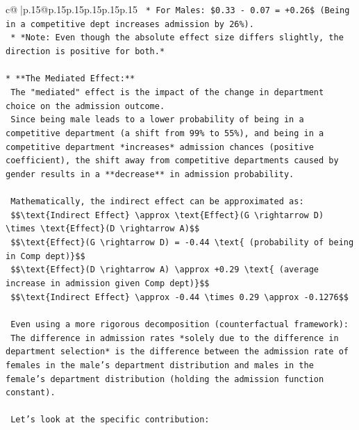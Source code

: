 \documentclass{article}
\begin{document}
{\begin{supertabular}{c@{$\;$}|p{.15\linewidth}@{}p{.15\linewidth}p{.15\linewidth}p{.15\linewidth}p{.15\linewidth}p{.15\linewidth}}
{{{\texttt{    *   For Males: \$0.33 {-} 0.07 = +0.26\$ (Being in a competitive dept increases admission by 26\%).} \\
\texttt{    *   *Note: Even though the absolute effect size differs slightly, the direction is positive for both.*} \\
\\ 
\texttt{*   **The Mediated Effect:**} \\
\texttt{    The "mediated" effect is the impact of the change in department choice on the admission outcome.} \\
\texttt{    Since being male leads to a lower probability of being in a competitive department (a shift from 99\% to 55\%), and being in a competitive department *increases* admission chances (positive coefficient), the shift away from competitive departments caused by gender results in a **decrease** in admission probability.} \\
\\ 
\texttt{    Mathematically, the indirect effect can be approximated as:} \\
\texttt{    \$\$\textbackslash{}text\{Indirect Effect\} \textbackslash{}approx \textbackslash{}text\{Effect\}(G \textbackslash{}rightarrow D) \textbackslash{}times \textbackslash{}text\{Effect\}(D \textbackslash{}rightarrow A)\$\$} \\
\texttt{    \$\$\textbackslash{}text\{Effect\}(G \textbackslash{}rightarrow D) = {-}0.44 \textbackslash{}text\{ (probability of being in Comp dept)\}\$\$} \\
\texttt{    \$\$\textbackslash{}text\{Effect\}(D \textbackslash{}rightarrow A) \textbackslash{}approx +0.29 \textbackslash{}text\{ (average increase in admission given Comp dept)\}\$\$} \\
\texttt{    \$\$\textbackslash{}text\{Indirect Effect\} \textbackslash{}approx {-}0.44 \textbackslash{}times 0.29 \textbackslash{}approx {-}0.1276\$\$} \\
\\ 
\texttt{    Even using a more rigorous decomposition (counterfactual framework):} \\
\texttt{    The difference in admission rates *solely due to the difference in department selection* is the difference between the admission rate of females in the male's department distribution and males in the female's department distribution (holding the admission function constant).} \\
\\ 
\texttt{    Let's look at the specific contribution:} \\
}}}
\end{supertabular}}
\end{document}
